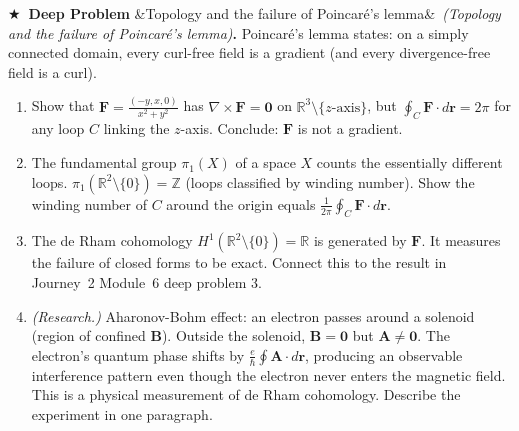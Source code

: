 \documentclass[12pt,a4paper]{article}
\newcounter{problem}
\newcounter{deepproblem}
\newenvironment{deepproblem}[1][]{\refstepcounter{deepproblem}\par\vspace{6pt}\noindent\textbf{\color{NavyBlue}$\bigstar$\ Deep Problem \thedeepproblem}\ifx&#1&\else\ \textit{(#1)}\fi\textbf{.}\enskip}{\par\vspace{4pt}}
\begin{document}
\begin{deepproblem}[Topology and the failure of Poincaré's lemma]
Poincaré's lemma states: on a simply connected domain, every curl-free field is a gradient (and every divergence-free field is a curl).
\begin{enumerate}[label=(\alph*)]
  \item Show that $\mathbf{F} = \frac{(-y,x,0)}{x^2+y^2}$ has $\nabla\times\mathbf{F}=\mathbf{0}$ on $\mathbb{R}^3\setminus\{z\text{-axis}\}$, but $\oint_C\mathbf{F}\cdot d\mathbf{r} = 2\pi$ for any loop $C$ linking the $z$-axis. Conclude: $\mathbf{F}$ is not a gradient.
  \item The fundamental group $\pi_1(X)$ of a space $X$ counts the essentially different loops. $\pi_1(\mathbb{R}^2\setminus\{0\}) = \mathbb{Z}$ (loops classified by winding number). Show the winding number of $C$ around the origin equals $\frac{1}{2\pi}\oint_C\mathbf{F}\cdot d\mathbf{r}$.
  \item The de Rham cohomology $H^1(\mathbb{R}^2\setminus\{0\}) = \mathbb{R}$ is generated by $\mathbf{F}$. It measures the failure of closed forms to be exact. Connect this to the result in Journey~2 Module~6 deep problem 3.
  \item \textit{(Research.)} Aharonov-Bohm effect: an electron passes around a solenoid (region of confined $\mathbf{B}$). Outside the solenoid, $\mathbf{B}=\mathbf{0}$ but $\mathbf{A}\neq\mathbf{0}$. The electron's quantum phase shifts by $\frac{e}{\hbar}\oint\mathbf{A}\cdot d\mathbf{r}$, producing an observable interference pattern even though the electron never enters the magnetic field. This is a physical measurement of de Rham cohomology. Describe the experiment in one paragraph.
\end{enumerate}
\end{deepproblem}
\end{document}
